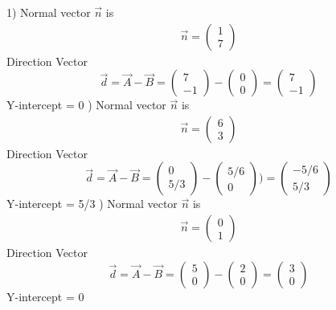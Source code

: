 \documentclass[journal,12pt,twocolumn]{IEEEtran}
\newcommand{\myvec}[1]{\ensuremath{\begin{pmatrix}#1\end{pmatrix}}}
\begin{document}
1) Normal vector $\vec{n}$ is   \begin{align}
	\vec{n} = \myvec{ 1 \\ 7 }
\end{align}
Direction Vector
\begin{equation}
		\vec{d} = \vec{A} -\vec{B}  = \myvec{ 7 \\ -1 } - \myvec{ 0 \\ 0 } = \myvec{ 7 \\ -1 } 
\end {equation}
\newline
Y-intercept = 0
\newline
{}) Normal vector $\vec{n}$ is \begin{align}
	\vec{n} = \myvec{ 6 \\ 3 }
\end{align}
Direction Vector
\begin{equation}
		\vec{d} = \vec{A} -\vec{B} = \myvec{ 0 \\ 5/3 } - \myvec{ 5/6 \\ 0 }) = \myvec{ -5/6 \\ 5/3 }
\end{equation} 	
\newline
Y-intercept = 5/3
\newline
{}) Normal vector $\vec{n}$ is  \begin{align}
	\vec{n} = \myvec{ 0 \\ 1 }
\end{align} 
Direction Vector
\begin{equation}
		\vec{d} = \vec{A} -\vec{B} = \myvec{ 5 \\ 0 } - \myvec{ 2 \\ 0 } = \myvec{ 3 \\ 0 }
\end{equation}
\newline
Y-intercept =  0
\end{document}
